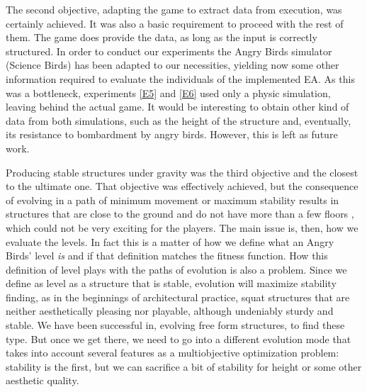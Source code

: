 \documentclass[a4paper,twoside]{article}
\begin{document}

The second objective, adapting the game to extract data from execution, was 
certainly achieved. It was also a basic requirement to proceed with the rest of 
them. The game does provide the data, as long as the input is correctly 
structured. 
In order to conduct our experiments the Angry Birds simulator (Science Birds) 
has been adapted to our necessities, yielding now some  other information 
required to evaluate the individuals of the implemented EA. As this was a 
bottleneck, experiments \ref{E5} and \ref{E6} used only a physic simulation,
leaving behind the actual game.
It would be interesting to obtain other kind of data from both simulations,
such as the height of the structure and, eventually, its resistance to
bombardment by angry birds. However, this is left as future work.

Producing stable structures under gravity was the third objective and
the closest to the ultimate one. That objective was effectively
achieved, but the consequence of evolving in a path of minimum
movement or maximum stability results in structures that are close to
the ground and do not have more than a few floors , which could not be very 
exciting for the players. 
The main issue is, then, how we evaluate the levels. In fact this is 
a matter of how we define what an Angry Birds' level \textit{is} and if that 
definition matches the fitness function.
How this definition of level plays
with the paths of evolution is also a problem. Since we define as
level as a structure that is stable, evolution will maximize stability
finding, as in the beginnings of architectural practice, squat
structures that are neither aesthetically pleasing nor playable,
although undeniably sturdy and stable. We have been successful in,
evolving free form structures, to find these type. But once we get
there, we need to go into a different evolution mode that takes into
account several features as a multiobjective optimization problem:
stability is the first, but we can sacrifice a bit of stability for
height or some other aesthetic quality.
\end{document}
